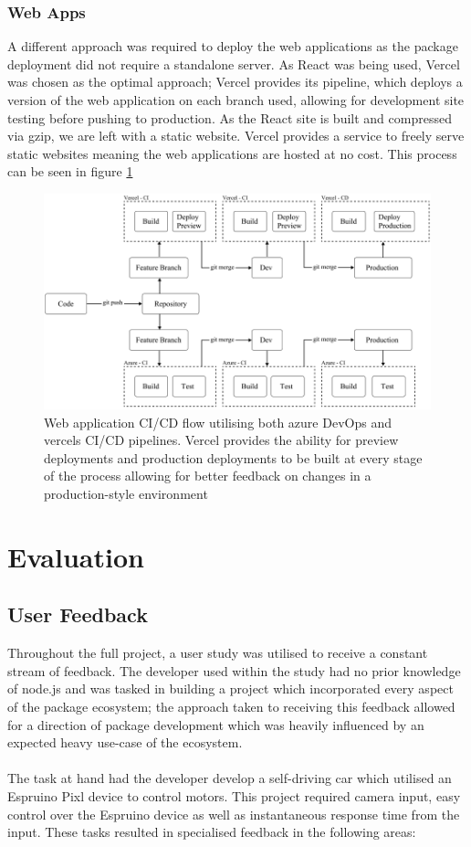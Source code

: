 \documentclass{l4proj}
\begin{document}
\subsection{Web Apps}
A different approach was required to deploy the web applications as the package deployment did not require a standalone server. As React was being used, Vercel was chosen as the optimal approach; Vercel provides its pipeline, which deploys a version of the web application on each branch used, allowing for development site testing before pushing to production. As the React site is built and compressed via gzip, we are left with a static website. Vercel provides a service to freely serve static websites meaning the web applications are hosted at no cost. This process can be seen in figure \ref{fig:web-app-deploy}

\begin{figure}[H]
    \centering
    \includegraphics[width=12.5cm]{dissertation/images/web-app-deploy.png}
    \caption{Web application CI/CD flow utilising both azure DevOps and vercels CI/CD pipelines. Vercel provides the ability for preview deployments and production deployments to be built at every stage of the process allowing for better feedback on changes in a production-style environment}
    \label{fig:web-app-deploy}
\end{figure}

\chapter{Evaluation} 

\section{User Feedback}
Throughout the full project, a user study was utilised to receive a constant stream of feedback. The developer used within the study had no prior knowledge of node.js and was tasked in building a project which incorporated every aspect of the package ecosystem; the approach taken to receiving this feedback allowed for a direction of package development which was heavily influenced by an expected heavy use-case of the ecosystem.
\\ \\
The task at hand had the developer develop a self-driving car which utilised an Espruino Pixl device to control motors. This project required camera input, easy control over the Espruino device as well as instantaneous response time from the input. These tasks resulted in specialised feedback in the following areas:
\end{document}
